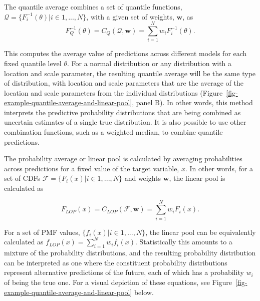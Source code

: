 \documentclass[
  letterpaper,
  DIV=11,
  numbers=noendperiod]{scrartcl}
\begin{document}
The quantile average combines a set of quantile functions,
\(\mathcal{Q} = \{F_i^{-1}(\theta)| i \in 1,...,N \}\), with a given set
of weights, \(\pmb{w}\), as \[
F^{-1}_Q(\theta) = C_Q(\mathcal{Q}, \pmb{w}) = \sum_{i = 1}^Nw_iF^{-1}_i(\theta).
\]

This computes the average value of predictions across different models
for each fixed quantile level \(\theta\). For a normal distribution or
any distribution with a location and scale parameter, the resulting
quantile average will be the same type of distribution, with location
and scale parameters that are the average of the location and scale
parameters from the individual distributions
(Figure~\ref{fig-example-quantile-average-and-linear-pool}, panel B). In
other words, this method interprets the predictive probability
distributions that are being combined as uncertain estimates of a single
true distribution. It is also possible to use other combination
functions, such as a weighted median, to combine quantile predictions.

The probability average or linear pool is calculated by averaging
probabilities across predictions for a fixed value of the target
variable, \(x\). In other words, for a set of CDFs
\(\mathcal{F} = \{F_i(x)| i \in 1,...,N \}\) and weights \(\pmb{w}\),
the linear pool is calculated as

\[
F_{LOP}(x) = C_{LOP}(\mathcal{F}, \pmb{w}) = \sum_{i = 1}^Nw_iF_i(x). 
\]

For a set of PMF values, \(\{f_i(x)|i \in 1, ..., N\}\), the linear pool
can be equivalently calculated as
\(f_{LOP}(x) = \sum_{i = 1}^N w_i f_i(x)\). Statistically this amounts
to a mixture of the probability distributions, and the resulting
probability distribution can be interpreted as one where the constituent
probability distributions represent alternative predictions of the
future, each of which has a probability \(w_i\) of being the true one.
For a visual depiction of these equations, see
Figure~\ref{fig-example-quantile-average-and-linear-pool} below.
\end{document}
